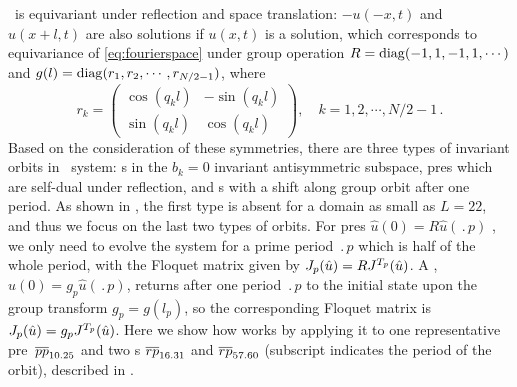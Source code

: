 \documentclass[final,leqno,onefignum,onetabnum]{siamltexmm}
\begin{document}
\KSe\ is equivariant under reflection and space translation: $-u(-x,t)$ and
$u(x+l,t)$ are also solutions if $u(x,t)$ is a solution, which corresponds
to equivariance of \eqref{eq:fourierspace} under group operation
 $R=\diag(-1,1,-1,1,\cdots)$ and $g(l)=\diag(r_{1},r_{2},\cdots,r_{N/2-1})$,
where
\[
r_{k}=
\begin{pmatrix}
  \cos(q_{k}l) & -\sin(q_{k}l) \\
  \sin(q_{k}l) & \cos(q_{k}l)
\end{pmatrix}
,\quad k=1,2,\cdots,N/2-1
\,.
\]
Based on the consideration of these symmetries,
there are three types of invariant orbits in \KS\ system: \po s in the
$b_k=0$ invariant antisymmetric subspace, pre\po s which are self-dual
under reflection, and \rpo s with a shift along group orbit after one
period. As shown in , the first type is absent for a domain
as small as $L=22$, and thus we focus on the last two types of orbits.
For pre\po s $\hat{u}(0)=R\hat{u}(\period{p})$ , we only need to evolve
the system for a prime period $\period{p}$ which is half of the whole
period, with the Floquet matrix given by
$J_{p}(\hat{u})=RJ^{{T_{p}}}(\hat{u})$. A \rpo,
$\hat{u}(0)=g_p\hat{u}(\period{p})$, returns after one period
$\period{p}$ to the initial state upon the group transform
$g_p=g(l_p)$, so the corresponding Floquet matrix is
$J_p(\hat{u})=g_pJ^{{T_{p}}}(\hat{u})$. Here we show how {\ped} works
by applying it to one representative pre\po\ ${\overline{pp}}_{10.25}$
and two
\rpo s ${\overline{rp}}_{16.31}$ and ${\overline{rp}}_{57.60}$
(subscript indicates the period of the orbit), described in
.
\end{document}
